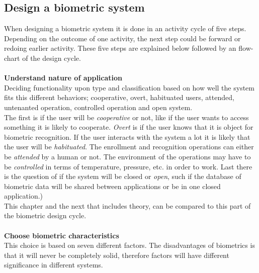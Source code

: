 \subsection{Design a biometric system}
When designing a biometric system it is done in an activity cycle of five steps. Depending on the outcome of one activity, the next step could be forward or redoing earlier activity. These five steps are explained below followed by an flow-chart of the design cycle.\\
\\
\textbf{Understand nature of application}\\
Deciding functionality upon type and classification based on how well the system fits this different behaviors; cooperative, overt, habituated users, attended, untenanted operation, controlled operation and open system. \\
The first is if the user will be \textit{cooperative} or not, like if the user wants to access something it is likely to cooperate. \textit{Overt} is if the user knows that it is object for biometric recognition. If the user interacts with the system a lot it is likely that the user will be \textit{habituated}. The enrollment and recognition operations can either be \textit{attended} by a human or not. The environment of the operations may have to be \textit{controlled} in terms of temperature, pressure, etc. in order to work. Last there is the question of if the system will be closed or \textit{open}, such if the database of biometric data will be shared between applications or be in one closed application.) \\
This chapter and the next that includes theory, can be compared to this part of the biometric design cycle.\\
\\
\textbf{Choose biometric characteristics }\label{auth:bio:character}\\ 
This choice is based on seven different factors. The disadvantages of biometrics is that it will never be completely solid, therefore factors will have different significance in different systems.
